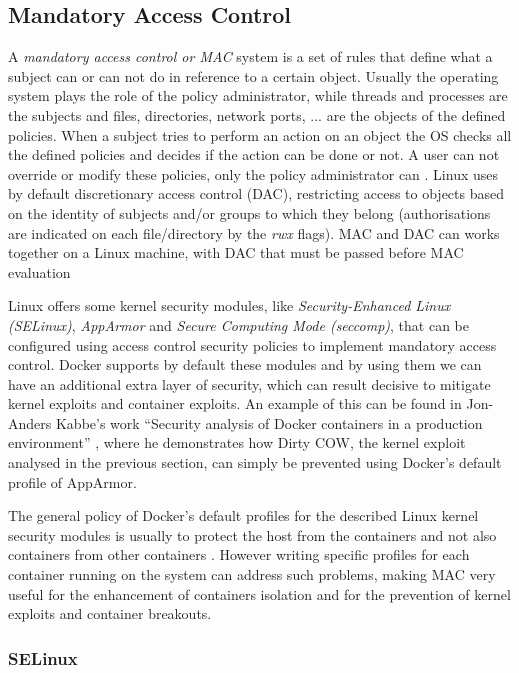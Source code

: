 \documentclass[a4paper,12pt]{article}
\begin{document}
\subsection{Mandatory Access Control}

A \textit{mandatory access control or MAC} system is a set of rules that define
what a subject can or can not do in reference to a certain object. Usually the
operating system plays the role of the policy administrator, while threads and
processes are the subjects and files, directories, network ports, ... are the
objects of the defined policies. When a subject tries to perform an action on an
object the OS checks all the defined policies and decides if the action can be
done or not. A user can not override or modify these policies, only the policy
administrator can \cite{wiki_MAC}. Linux uses by default discretionary access
control (DAC), restricting access to objects based on the identity of subjects
and/or groups to which they belong (authorisations are indicated on each
file/directory by the \textit{rwx} flags). MAC and DAC can works together on a
Linux machine, with DAC that must be passed before MAC evaluation \par Linux
offers some kernel security modules, like \textit{Security-Enhanced Linux
(SELinux)}, \textit{AppArmor} and \textit{Secure Computing Mode (seccomp)}, that
can be configured using access control security policies to implement mandatory
access control. Docker supports by default these modules and by using them we
can have an additional extra layer of security, which can result decisive to
mitigate kernel exploits and container exploits. An example of this can be found
in Jon-Anders Kabbe's work ``Security analysis of Docker containers in a
production environment'' \cite{kabbe_security_docker}, where he demonstrates how
Dirty COW, the kernel exploit analysed in the previous section, can simply be
prevented using Docker's default profile of AppArmor. \par  The general policy
of Docker's default profiles for the described Linux kernel security modules is
usually to protect the host from the containers and not also containers from
other containers \cite{to_docker_or_not_to_docker}. However writing specific
profiles for each container running on the system can address such problems,
making MAC very useful for the enhancement of containers isolation and for the
prevention of kernel exploits and container breakouts. 

\subsubsection{SELinux}
\end{document}
